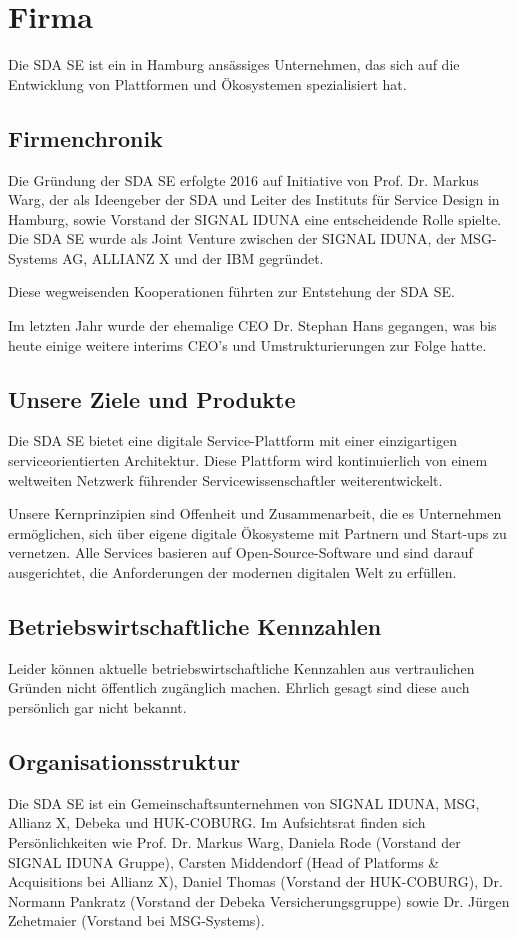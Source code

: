 \chapter{Firma}
\label{ch:firma}
Die SDA SE ist ein in Hamburg ansässiges Unternehmen, das sich auf die Entwicklung von Plattformen und Ökosystemen spezialisiert hat.

\section{Firmenchronik}
\label{sec:intro:firmenchronik}
Die Gründung der SDA SE erfolgte 2016 auf Initiative von Prof. Dr. Markus Warg, der als Ideengeber der SDA und Leiter des Instituts
für Service Design in Hamburg, sowie Vorstand der SIGNAL IDUNA eine entscheidende Rolle spielte.
Die SDA SE wurde als Joint Venture zwischen der SIGNAL IDUNA, der MSG-Systems AG, ALLIANZ X und der IBM gegründet.

Diese wegweisenden Kooperationen führten zur Entstehung der SDA SE.

Im letzten Jahr wurde der ehemalige CEO Dr. Stephan Hans gegangen, was bis heute einige weitere interims CEO's und Umstrukturierungen zur Folge hatte.

\section{Unsere Ziele und Produkte}
\label{sec:intro:produktspekturm}
Die SDA SE bietet eine digitale Service-Plattform mit einer einzigartigen serviceorientierten Architektur.
Diese Plattform wird kontinuierlich von einem weltweiten Netzwerk führender Servicewissenschaftler weiterentwickelt.

Unsere Kernprinzipien sind Offenheit und Zusammenarbeit, die es Unternehmen ermöglichen, sich über eigene digitale Ökosysteme mit Partnern und Start-ups zu vernetzen.
Alle Services basieren auf Open-Source-Software und sind darauf ausgerichtet, die Anforderungen der modernen digitalen Welt zu erfüllen.

\section{Betriebswirtschaftliche Kennzahlen}
\label{sec:intro:betrwirtschaftliche-kennzahlen}
Leider können aktuelle betriebswirtschaftliche Kennzahlen aus vertraulichen Gründen nicht öffentlich zugänglich machen.
Ehrlich gesagt sind diese auch persönlich gar nicht bekannt.

\section{Organisationsstruktur}
\label{sec:intro:organisationsstruktur}
Die SDA SE ist ein Gemeinschaftsunternehmen von SIGNAL IDUNA, MSG, Allianz X, Debeka und HUK-COBURG.
Im Aufsichtsrat finden sich Persönlichkeiten wie Prof. Dr. Markus Warg, Daniela Rode (Vorstand der SIGNAL IDUNA Gruppe), Carsten Middendorf (Head of Platforms & Acquisitions bei Allianz X), Daniel Thomas (Vorstand der HUK-COBURG), Dr. Normann Pankratz (Vorstand der Debeka Versicherungsgruppe) sowie Dr. Jürgen Zehetmaier (Vorstand bei MSG-Systems).

